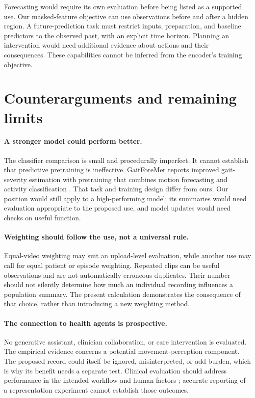 \documentclass{article}
\begin{document}
Forecasting would require its own evaluation before being listed as a supported use. Our masked-feature objective can use observations before and after a hidden region. A future-prediction task must restrict inputs, preparation, and baseline predictors to the observed past, with an explicit time horizon. Planning an intervention would need additional evidence about actions and their consequences. These capabilities cannot be inferred from the encoder's training objective.

\section{Counterarguments and remaining limits}

\paragraph{A stronger model could perform better.}
The classifier comparison is small and procedurally imperfect. It cannot establish that predictive pretraining is ineffective. GaitForeMer reports improved gait-severity estimation with pretraining that combines motion forecasting and activity classification \citep{endo2022gaitforemer}. That task and training design differ from ours. Our position would still apply to a high-performing model: its summaries would need evaluation appropriate to the proposed use, and model updates would need checks on useful function.

\paragraph{Weighting should follow the use, not a universal rule.}
Equal-video weighting may suit an upload-level evaluation, while another use may call for equal patient or episode weighting. Repeated clips can be useful observations and are not automatically erroneous duplicates. Their number should not silently determine how much an individual recording influences a population summary. The present calculation demonstrates the consequence of that choice, rather than introducing a new weighting method.

\paragraph{The connection to health agents is prospective.}
No generative assistant, clinician collaboration, or care intervention is evaluated. The empirical evidence concerns a potential movement-perception component. The proposed record could itself be ignored, misinterpreted, or add burden, which is why its benefit needs a separate test. Clinical evaluation should address performance in the intended workflow and human factors \citep{vasey2022decideai}; accurate reporting of a representation experiment cannot establish those outcomes.
\end{document}
